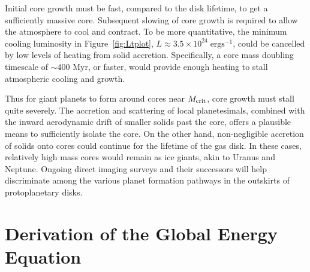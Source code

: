 \documentclass[apj, numberedappendix]{emulateapj}
\newcommand{\Fig}[1]{Figure~\ref{#1}}
\newcommand{\MC}{M_{\rm crit}}
\begin{document}
Initial core growth must be fast, compared to the disk lifetime, to get a sufficiently massive core.  Subsequent slowing of core growth is required to allow the atmosphere to cool and contract.  To be more quantitative, the minimum cooling luminosity in \Fig{fig:Ltplot}, $L\approx 3.5 \times 10^{24}\;\mathrm{erg s}^{-1}$, could be cancelled by low levels of heating from solid accretion.  Specifically, a core mass doubling timescale of $\sim$$400$ Myr, or faster, would provide enough heating to stall atmospheric cooling and growth.  

Thus for giant planets to form around cores near $\MC$, core growth must stall quite severely.   The accretion and scattering of local planetesimals, combined with the inward aerodynamic drift of smaller solids past the core, offers a plausible means to sufficiently isolate the core.  On the other hand, non-negligible accretion of solids onto cores could continue for the lifetime of the gas disk.  In these cases, relatively high mass cores would remain as ice giants, akin to Uranus and Neptune.   Ongoing direct imaging surveys and their successors \citep{hinz12, macintosh12} will help discriminate among the various planet formation pathways in the outskirts of protoplanetary disks.







\appendix
\section{Derivation of the Global Energy Equation}\label{sec:globalderiv}
\end{document}
